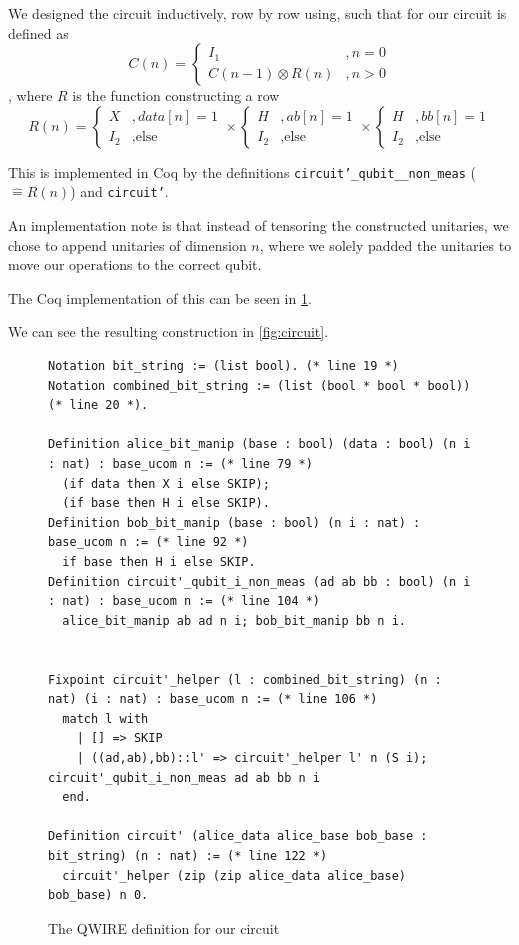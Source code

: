 \documentclass{article}
\begin{document}
We designed the circuit inductively, row by row using, such that for our circuit is defined as
$$C(n) = \begin{cases}
I_1&, n=0\\
C(n-1) \otimes R(n)&, n>0
\end{cases}$$,
where $R$ is the function constructing a row
$$R(n) = \begin{cases}X&, data[n] = 1\\ I_2&, \text{else}\end{cases} \times \begin{cases}H&, ab[n] = 1\\ I_2&, \text{else}\end{cases} \times \begin{cases}H&, bb[n] = 1\\ I_2&, \text{else}\end{cases}$$

This is implemented in Coq by the definitions \texttt{circuit'\_qubit\_\_non\_meas} ($\hat{=} R(n)$) and \texttt{circuit'}.

An implementation note is that instead of tensoring the constructed unitaries, we chose to append unitaries of dimension $n$, where we solely padded the unitaries to move our operations to the correct qubit.

The Coq implementation of this can be seen in \cref{fig:Coq-circuit}.

We can see the resulting construction in \cref{fig:circuit}.
\begin{figure}[h]
    \centering
    \begin{verbatim}
Notation bit_string := (list bool). (* line 19 *)
Notation combined_bit_string := (list (bool * bool * bool)) (* line 20 *). 

Definition alice_bit_manip (base : bool) (data : bool) (n i : nat) : base_ucom n := (* line 79 *)
  (if data then X i else SKIP);
  (if base then H i else SKIP).
Definition bob_bit_manip (base : bool) (n i : nat) : base_ucom n := (* line 92 *)
  if base then H i else SKIP.
Definition circuit'_qubit_i_non_meas (ad ab bb : bool) (n i : nat) : base_ucom n := (* line 104 *)
  alice_bit_manip ab ad n i; bob_bit_manip bb n i.

 
Fixpoint circuit'_helper (l : combined_bit_string) (n : nat) (i : nat) : base_ucom n := (* line 106 *)
  match l with
    | [] => SKIP
    | ((ad,ab),bb)::l' => circuit'_helper l' n (S i); circuit'_qubit_i_non_meas ad ab bb n i
  end.
    
Definition circuit' (alice_data alice_base bob_base : bit_string) (n : nat) := (* line 122 *)
  circuit'_helper (zip (zip alice_data alice_base) bob_base) n 0.
    \end{verbatim}
    \caption{The QWIRE definition for our circuit}
    \label{fig:Coq-circuit}
\end{figure}
\end{document}
